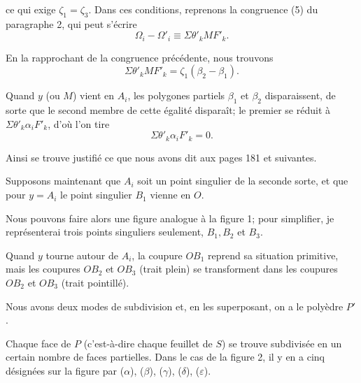 \documentclass{article}
\begin{document}
ce qui exige $\zeta_{1} = \zeta_{3}$. Dans ces conditions, reprenons la congruence (5) du paragraphe 2, qui peut s'écrire
\[ \Omega_{i} - \Omega'_{i} \equiv \Sigma \theta'_{k} MF'_{k}. \]

En la rapprochant de la congruence précédente, nous trouvons
\[ \Sigma \theta'_{k} MF'_{k} = \zeta_{1}(\beta_{2} - \beta_{1}). \]

Quand $y$ (ou $M$) vient en $A_{i}$, les polygones partiels $\beta_{1}$ et $\beta_{2}$ disparaissent, de sorte que le second membre de cette égalité disparaît; le premier se réduit à $\Sigma \theta'_{k} \alpha_{i}F'_{k}$, d'où l'on tire
\[ \Sigma \theta'_{k} \alpha_{i}F'_{k} = 0. \]

Ainsi se trouve justifié ce que nous avons dit aux pages 181 et suivantes.

Supposons maintenant que $A_{i}$ soit un point singulier de la seconde sorte, et que pour $y = A_{i}$ le point singulier $B_{1}$ vienne en $O$.

Nous pouvons faire alors une figure analogue à la figure 1; pour simplifier, je représenterai trois points singuliers seulement, $B_{1}, B_{2}$ et $B_{3}$.

Quand $y$ tourne autour de $A_{i}$, la coupure $OB_{1}$ reprend sa situation
primitive, mais les coupures $OB_{2}$ et $OB_{3}$ (trait plein) se transforment dans les coupures $OB_{2}$ et $OB_{3}$ (trait pointillé).


Nous avons deux modes de subdivision et, en les superposant, on a le polyèdre $P'$.

Chaque face de $P$ (c'est-à-dire chaque feuillet de $S$) se trouve subdivisée en un certain nombre de faces partielles. Dans le cas de la figure 2, il y en a cinq désignées sur la figure par ($\alpha$), ($\beta$), ($\gamma$), ($\delta$), ($\varepsilon$).
\end{document}
